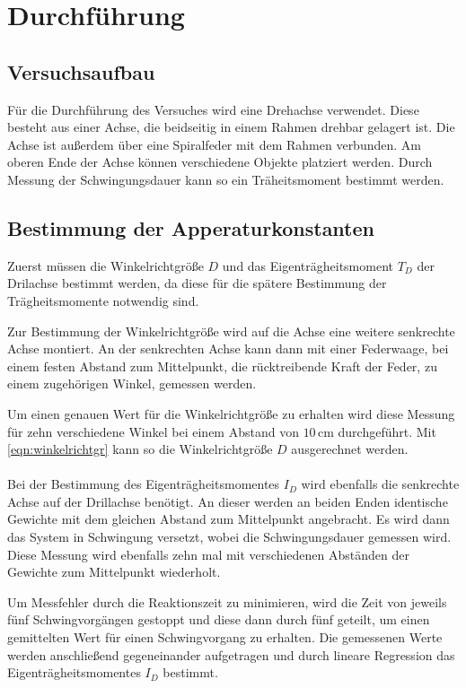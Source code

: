 \section{Durchführung}
\label{sec:Durchführung}

\subsection{Versuchsaufbau}
Für die Durchführung des Versuches wird eine Drehachse verwendet. Diese besteht aus einer Achse, die beidseitig in einem Rahmen drehbar gelagert ist. Die Achse ist außerdem über eine Spiralfeder
mit dem Rahmen verbunden. Am oberen Ende der Achse können verschiedene Objekte platziert werden. Durch Messung der Schwingungsdauer kann so ein Träheitsmoment bestimmt werden.

\subsection{Bestimmung der Apperaturkonstanten}
Zuerst müssen die Winkelrichtgröße $D$ und das Eigenträgheitsmoment $ T_D $ der Drilachse bestimmt werden, da diese für die spätere Bestimmung der Trägheitsmomente notwendig sind.

Zur Bestimmung der Winkelrichtgröße wird auf die Achse eine weitere senkrechte Achse montiert. An der senkrechten Achse kann dann mit einer Federwaage, bei einem festen Abstand zum Mittelpunkt,
die rücktreibende Kraft der Feder, zu einem zugehörigen Winkel, gemessen werden.

Um einen genauen Wert für die Winkelrichtgröße zu erhalten wird diese Messung für zehn verschiedene Winkel bei einem
Abstand von $10 \,\si{\centi\meter}$ durchgeführt. Mit \autoref{eqn:winkelrichtgr} kann so die Winkelrichtgröße $D$ ausgerechnet werden.
\\
\\
Bei der Bestimmung des Eigenträgheitsmomentes $ I_D $ wird ebenfalls die senkrechte Achse auf der Drillachse benötigt. An dieser werden an beiden Enden identische Gewichte mit dem gleichen Abstand
zum Mittelpunkt angebracht. Es wird dann das System in Schwingung versetzt, wobei die Schwingungsdauer gemessen wird. Diese Messung wird ebenfalls zehn mal mit verschiedenen Abständen der Gewichte
zum Mittelpunkt wiederholt.

Um Messfehler durch die Reaktionszeit zu minimieren, wird die Zeit von jeweils fünf Schwingvorgängen gestoppt und diese dann durch fünf geteilt, um einen gemittelten
Wert für einen Schwingvorgang zu erhalten. Die gemessenen Werte werden anschließend gegeneinander aufgetragen und durch lineare Regression das Eigenträgheitsmomentes $ I_D $ bestimmt.

